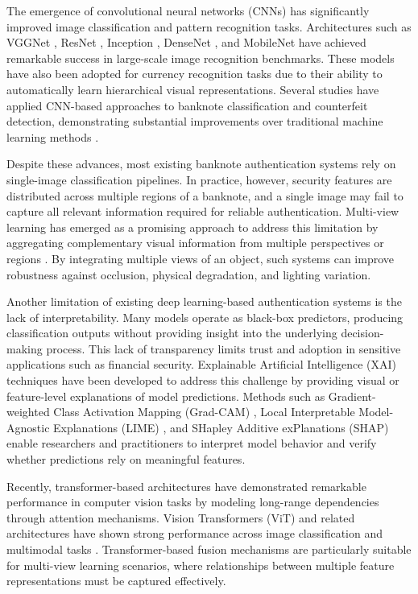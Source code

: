 \documentclass[preprint,12pt,authoryear]{elsarticle}
\begin{document}
The emergence of convolutional neural networks (CNNs) has significantly improved image classification and pattern recognition tasks. Architectures such as VGGNet \cite{simonyan2015vgg}, ResNet \cite{he2016deep}, Inception \cite{szegedy2016inception}, DenseNet \cite{huang2017densely}, and MobileNet \cite{sandler2018mobilenetv2} have achieved remarkable success in large-scale image recognition benchmarks. These models have also been adopted for currency recognition tasks due to their ability to automatically learn hierarchical visual representations. Several studies have applied CNN-based approaches to banknote classification and counterfeit detection, demonstrating substantial improvements over traditional machine learning methods \cite{baek2018counterfeit,berenguel2016banknote}.

Despite these advances, most existing banknote authentication systems rely on single-image classification pipelines. In practice, however, security features are distributed across multiple regions of a banknote, and a single image may fail to capture all relevant information required for reliable authentication. Multi-view learning has emerged as a promising approach to address this limitation by aggregating complementary visual information from multiple perspectives or regions \cite{xu2013survey}. By integrating multiple views of an object, such systems can improve robustness against occlusion, physical degradation, and lighting variation.

Another limitation of existing deep learning-based authentication systems is the lack of interpretability. Many models operate as black-box predictors, producing classification outputs without providing insight into the underlying decision-making process. This lack of transparency limits trust and adoption in sensitive applications such as financial security. Explainable Artificial Intelligence (XAI) techniques have been developed to address this challenge by providing visual or feature-level explanations of model predictions. Methods such as Gradient-weighted Class Activation Mapping (Grad-CAM) \cite{selvaraju2017gradcam}, Local Interpretable Model-Agnostic Explanations (LIME) \cite{ribeiro2016lime}, and SHapley Additive exPlanations (SHAP) \cite{lundberg2017shap} enable researchers and practitioners to interpret model behavior and verify whether predictions rely on meaningful features.

Recently, transformer-based architectures have demonstrated remarkable performance in computer vision tasks by modeling long-range dependencies through attention mechanisms. Vision Transformers (ViT) and related architectures have shown strong performance across image classification and multimodal tasks \cite{dosovitskiy2021vit}. Transformer-based fusion mechanisms are particularly suitable for multi-view learning scenarios, where relationships between multiple feature representations must be captured effectively.
\end{document}
